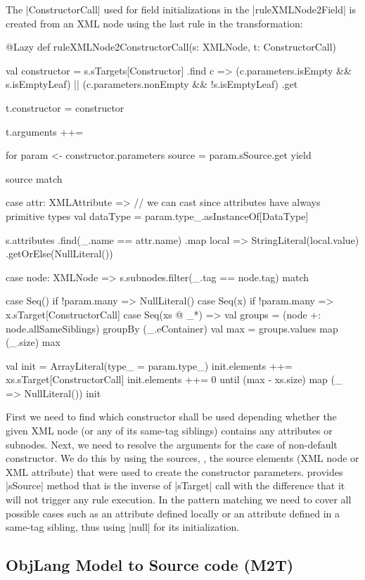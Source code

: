 The \Scala|ConstructorCall| used for field initializations in the \Scala|ruleXMLNode2Field| is created from an XML node using the last rule in the transformation:
%
\begin{scalacode}
@Lazy
def ruleXMLNode2ConstructorCall(s: XMLNode, t: ConstructorCall) {
  val constructor = s.sTargets[Constructor]
    .find { c =>
      (c.parameters.isEmpty && s.isEmptyLeaf) ||
      (c.parameters.nonEmpty && !s.isEmptyLeaf)
    }
    .get

  t.constructor = constructor

  t.arguments ++= {
    for {
      param <- constructor.parameters
      source = param.sSource.get
    } yield {
      source match {
        case attr: XMLAttribute =>
          // we can cast since attributes have always primitive types
          val dataType = param.type_.asInstanceOf[DataType]

          s.attributes
            .find(_.name == attr.name)
            .map { local => StringLiteral(local.value) }
            .getOrElse(NullLiteral())

        case node: XMLNode =>
          s.subnodes.filter(_.tag == node.tag) match {

            case Seq() if !param.many =>
              NullLiteral()
            case Seq(x) if !param.many =>
              x.sTarget[ConstructorCall]
            case Seq(xs @ _*) =>
              val groups = (node +: node.allSameSiblings) groupBy (_.eContainer)
              val max = groups.values map (_.size) max
              
              val init = ArrayLiteral(type_ = param.type_)
              init.elements ++= xs.sTarget[ConstructorCall]
              init.elements ++= 0 until (max - xs.size) map (_ => NullLiteral())
              init
          }
      }
    }
  }
}
\end{scalacode}  

First we need to find which constructor shall be used depending whether the given XML node (or any of its same-tag siblings) contains any attributes or subnodes.
Next, we need to resolve the arguments for the case of non-default constructor.
We do this by using the sources, \Ie, the source elements (XML node or XML attribute) that were used to create the constructor parameters.
\SIGMA provides \Scala|sSource| method that is the inverse of \Scala|sTarget| call with the difference that it will not trigger any rule execution.
In the pattern matching we need to cover all possible cases such as an attribute defined locally or an attribute defined in a same-tag sibling, thus using \Scala|null| for its initialization.

\subsection{ObjLang Model to Source code (M2T)}


